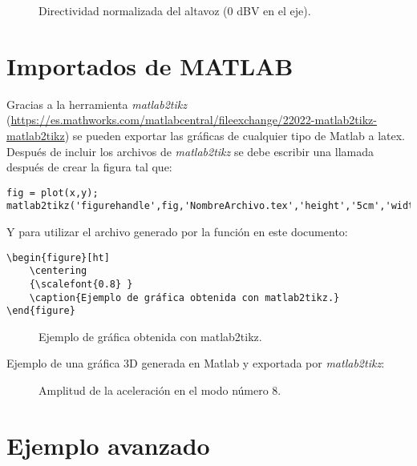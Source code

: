 \begin{figure}[H]
    	\centering%
         {%
    }
    \caption{Directividad normalizada del altavoz (0 dBV en el eje).}\label{norma}
\end{figure}


\section{Importados de MATLAB}
\label{impmatlab}
Gracias a la herramienta \textit{matlab2tikz} (\url{https://es.mathworks.com/matlabcentral/fileexchange/22022-matlab2tikz-matlab2tikz}) se pueden exportar las gráficas de cualquier tipo de Matlab a latex.
Después de incluir los archivos de \textit{matlab2tikz} se debe escribir una llamada después de crear la figura tal que:

\begin{lstlisting}[style=Matlab-color,caption={Ejemplo de llamada a matlab2tikz}]
fig = plot(x,y);
matlab2tikz('figurehandle',fig,'NombreArchivo.tex','height','5cm','width','13.5cm','strict',true,'showHiddenStrings',true,'showInfo',false)
\end{lstlisting}

Y para utilizar el archivo generado por la función en este documento:
\begin{lstlisting}[style=Latex-color]
\begin{figure}[ht]
	\centering
	{\scalefont{0.8} }
	\caption{Ejemplo de gráfica obtenida con matlab2tikz.}
\end{figure}
\end{lstlisting}

\begin{figure}[ht]
	\centering
	{ }
	\caption{Ejemplo de gráfica obtenida con matlab2tikz.}
\end{figure}
\FloatBarrier
Ejemplo de una gráfica 3D generada en Matlab y exportada por \textit{matlab2tikz}:
\begin{figure}[ht]
		\centering
		{ }
		\caption{Amplitud de la aceleración en el modo número 8.}
\end{figure}
\FloatBarrier

\section{Ejemplo avanzado}

